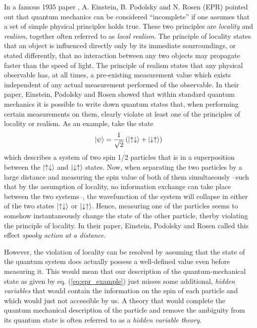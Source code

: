 In a famous 1935 paper \citep{einstein_can_1935}, A. Einstein, B. Podolsky and N. Rosen (EPR) pointed out that quantum mechanics can be considered ``incomplete'' if one assumes that a set of simple physical principles holds true. These two principles are {\it locality} and {\it realism}, together often referred to as {\it local realism}. The principle of locality states that an object is influenced directly only by its immediate sourroundings, or stated differently, that no interaction between any two objects may propagate faster than the speed of light. The principle of realism states that any physical observable has, at all times, a pre-existing measurement value which exists independent of any actual measurement performed of the observable. In their paper, Einstein, Podolsky and Rosen showed that within standard quantum mechanics it is possible to write down quantum states that, when performing certain measurements on them, clearly violate at least one of the principles of locality or realism. As an example, take the state
%
\begin{equation}
\left| \psi \right> = \frac{1}{\sqrt{2}}\left(\left| \uparrow \downarrow \right>+\left| \downarrow \uparrow \right>\right) \label{eq:epr_example}
\end{equation}
%
which describes a system of two spin 1/2 particles that is in a superposition between the $\left| \uparrow \downarrow \right>$ and $\left| \downarrow \uparrow \right>$ states. Now, when separating the two particles by a large distance and measuring the spin value of both of them simultaeously --such that by the assumption of locality, no information exchange can take place between the two systems--, the wavefunction of the system will collapse in either of the two states $\left| \uparrow \downarrow \right>$ or $\left| \downarrow \uparrow \right>$. Hence, measuring one of the particles seems to somehow instantaneously change the state of the other particle, therby violating the principle of locality. In their paper, Einstein, Podolsky and Rosen called this effect {\it spooky action at a distance}.

\smallskip

However, the violation of locality can be resolved by assuming that the state of the quantum system does actually possess a well-defined value even before measuring it. This would mean that our description of the quantum-mechanical state as given by eq. (\ref{eq:epr_example}) just misses some additional, {\it hidden variables} that would contain the information on the spin of each particle and which would just not accessible by us. A theory that would complete the quantum mechanical description of the particle and remove the ambiguity from its quantum state is often referred to as a {\it hidden variable theory}.

